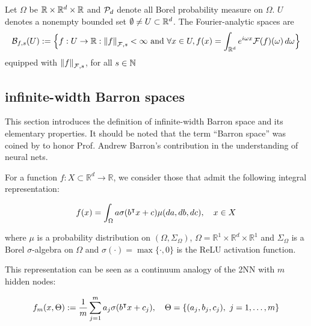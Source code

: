 \begin{definition}
    Let $\Omega$ be $\mathbb{R} \times \mathbb{R}^d \times \mathbb{R}$ and $\mathcal{P}_d$ denote all Borel
    probability measure on $\Omega$. $U$ denotes a nonempty bounded set
    $\emptyset \not= U \subset \mathbb{R}^d$. The Fourier-analytic spaces are
    \begin{equation}
        \mathcal{B}_{f,s}(U) := \Big\{
            f: U \to \mathbb{R}: \left\| f \right\|_{\mathcal{F}, {s}} < \infty  \textrm{ and }
            \forall x\in U, 
                f(x) = \int_{\mathbb{R}^d} e^{i\omega x} \mathcal{F}(f)(\omega)\,d\omega
        \Big\}
    \end{equation}
    equipped with $\left\| f \right\|_{\mathcal{F}, {s}}$, for all $s \in \mathbb{N}$
\end{definition}

\subsection{infinite-width Barron spaces}
\label{sec:barron_norm}

This section introduces the definition of infinite-width Barron space and its
elementary properties. It should be noted that the term ``Barron space'' was
coined by \cite{ePrioriEstimatesPopulation2019} to honor Prof. Andrew Barron's
contribution in the understanding of neural nets.


For a function $f: X \subset \mathbb{R}^d \to \mathbb{R}$, we consider those
that admit the following integral representation:

\begin{equation}
    \label{eq:barron_represent}
    f(x) = \int_{\Omega} a \sigma(b{}^{\intercal} x + c) \mu(da, db, dc), \quad x \in X
\end{equation}

where $\mu$ is a probability distribution on $(\Omega, \Sigma_\Omega)$, $\Omega
= \mathbb{R}^1 \times \mathbb{R}^d \times \mathbb{R}^1$ and $\Sigma_\Omega$ is
a Borel $\sigma$-algebra on $\Omega$ and $\sigma(\cdot) = \max\{\cdot, 0\}$ is
the ReLU activation function.

This representation can be seen as a continuum analogy of the 2NN with $m$
hidden nodes:

\begin{equation}
    f_m(x, \Theta) := \frac{1}{m} 
    \sum_{j=1}^m a_j 
        \sigma(b{}^{\intercal} x + c_j), 
    \quad \Theta = \{(a_j, b_j, c_j), \ j = 1, \dots, m\}
\end{equation}

